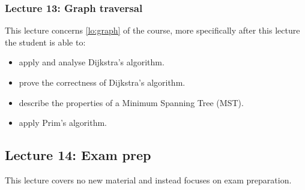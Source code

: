 \subsubsection*{Lecture 13: Graph traversal}
\label{sub:lecture_13}

This lecture concerns \cref{lo:graph} of the course, more specifically after this lecture the student is able
to:
\begin{itemize}
	\item apply and analyse Dijkstra's algorithm.
	\item prove the correctness of Dijkstra's algorithm.
	\item describe the properties of a Minimum Spanning Tree (MST).
	\item apply Prim's algorithm.
\end{itemize}

\subsection*{Lecture 14: Exam prep}
\label{sub:lecture_14}

This lecture covers no new material and instead focuses on exam preparation.


